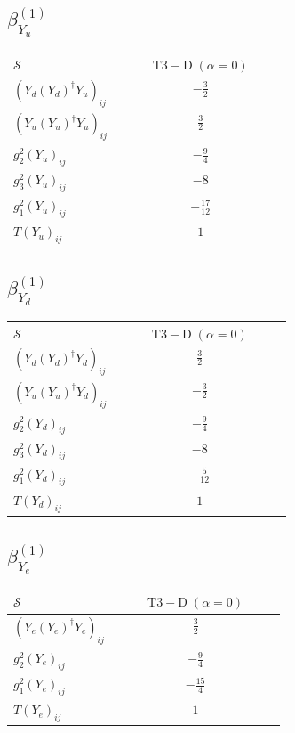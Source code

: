 \documentclass[9pt]{article}
\begin{document}
\subsection*{$ \beta_{Y_u}^{(1)} $}
\begin{longtable}{@{}p{0.38\linewidth}c@{}}
\toprule
$\mathcal{S}$ & $ \mathrm{T3-D}\;(\alpha=0) $ \\
\midrule
$ (Y_d (Y_d)^{\dagger} Y_u)_{ij} $ & $ - \frac{3}{2} $ \\
$ (Y_u (Y_u)^{\dagger} Y_u)_{ij} $ & $ \frac{3}{2} $ \\
$ g_2^2 (Y_u)_{ij} $ & $ - \frac{9}{4} $ \\
$ g_3^2 (Y_u)_{ij} $ & $ -8 $ \\
$ g_1^2 (Y_u)_{ij} $ & $ - \frac{17}{12} $ \\
$ T (Y_u)_{ij} $ & $ 1 $ \\
\bottomrule
\end{longtable}
\subsection*{$ \beta_{Y_d}^{(1)} $}
\begin{longtable}{@{}p{0.38\linewidth}c@{}}
\toprule
$\mathcal{S}$ & $ \mathrm{T3-D}\;(\alpha=0) $ \\
\midrule
$ (Y_d (Y_d)^{\dagger} Y_d)_{ij} $ & $ \frac{3}{2} $ \\
$ (Y_u (Y_u)^{\dagger} Y_d)_{ij} $ & $ - \frac{3}{2} $ \\
$ g_2^2 (Y_d)_{ij} $ & $ - \frac{9}{4} $ \\
$ g_3^2 (Y_d)_{ij} $ & $ -8 $ \\
$ g_1^2 (Y_d)_{ij} $ & $ - \frac{5}{12} $ \\
$ T (Y_d)_{ij} $ & $ 1 $ \\
\bottomrule
\end{longtable}
\subsection*{$ \beta_{Y_e}^{(1)} $}
\begin{longtable}{@{}p{0.38\linewidth}c@{}}
\toprule
$\mathcal{S}$ & $ \mathrm{T3-D}\;(\alpha=0) $ \\
\midrule
$ (Y_e (Y_e)^{\dagger} Y_e)_{ij} $ & $ \frac{3}{2} $ \\
$ g_2^2 (Y_e)_{ij} $ & $ - \frac{9}{4} $ \\
$ g_1^2 (Y_e)_{ij} $ & $ - \frac{15}{4} $ \\
$ T (Y_e)_{ij} $ & $ 1 $ \\
\bottomrule
\end{longtable}
\end{document}
